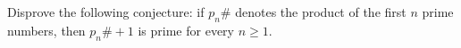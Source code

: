 Disprove the following conjecture: if $p_n\#$ denotes the product of the first $n$ prime numbers, then $p_n\#+1$ is prime for every $n\ge1$.
